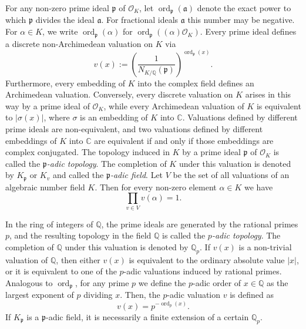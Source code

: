 \documentclass[11pt]{report}
\theoremstyle{definition}
\DeclareMathOperator{\ord}{ord}
\begin{document}
For any non-zero prime ideal $\mathfrak{p}$ of $\mathcal{O}_K$, let $\ord_{\mathfrak{p}}(\mathfrak{a})$ denote the exact power to which $\mathfrak{p}$ divides the ideal $\mathfrak{a}$. For fractional ideals $\mathfrak{a}$ this number may be negative. For $\alpha \in K$, we write $\ord_{\mathfrak{p}}(\alpha)$ for $\ord_{\mathfrak{p}}\left((\alpha)\mathcal{O}_K\right)$. Every prime ideal defines a discrete non-Archimedean valuation on $K$ via
\[v(x):= \left(\frac{1}{N_{K/\mathbb{Q}}(\mathfrak{p})}\right)^{\ord_{\mathfrak{p}}(x)}.\]
Furthermore, every embedding of $K$ into the complex field defines an Archimedean valuation. Conversely, every discrete valuation on $K$ arises in this way by a prime ideal of $\mathcal{O}_K$, while every Archimedean valuation of $K$ is equivalent to $|\sigma(x)|$, where $\sigma$ is an embedding of $K$ into $\mathbb{C}$. Valuations defined by different prime ideals are non-equivalent, and two valuations defined by different embeddings of $K$ into $\mathbb{C}$ are equivalent if and only if those embeddings are complex conjugated. The topology induced in $K$ by a prime ideal $\mathfrak{p}$ of $\mathcal{O}_K$ is called the \textit{$\mathfrak{p}$-adic topology}. The completion of $K$ under this valuation is denoted by $K_{\mathfrak{p}}$ or $K_v$ and called the \textit{$\mathfrak{p}$-adic field}. Let $V$ be the set of all valuations of an algebraic number field $K$. Then for every non-zero element $\alpha \in K$ we have
\[\prod_{v \in V} v(\alpha) = 1.\]

In the ring of integers of $\mathbb{Q}$, the prime ideals are generated by the rational primes $p$, and the resulting topology in the field $\mathbb{Q}$ is called the \textit{$p$-adic topology}. The completion of $\mathbb{Q}$ under this valuation is denoted by $\mathbb{Q}_p$. If $v(x)$ is a non-trivial valuation of $\mathbb{Q}$, then either $v(x)$ is equivalent to the ordinary absolute value $|x|$, or it is equivalent to one of the $p$-adic valuations induced by rational primes. Analogous to $\ord_{\mathfrak{p}}$, for any prime $p$ we define the $p$-adic order of $x \in \mathbb{Q}$ as the largest exponent of $p$ dividing $x$. Then, the $p$-adic valuation $v$ is defined as
\[v(x) = p^{-\ord_p(x)}.\]
If $K_{\mathfrak{p}}$ is a $\mathfrak{p}$-adic field, it is necessarily a finite extension of a certain $\mathbb{Q}_p$.
\end{document}
